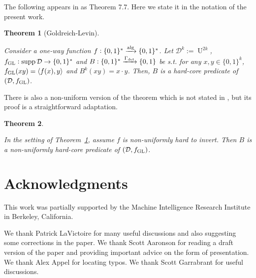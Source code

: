 \documentclass{article}
\numberwithin{equation}{section}
\theoremstyle{definition}
\theoremstyle{plain}
\newtheorem{theorem}{Theorem}[section]
\newcommand{\Bool}{\{0,1\}}
\newcommand{\Words}{{\Bool^*}}
\newcommand{\WordsLen}[1]{{\Bool^{#1}}}
\DeclareMathOperator{\Supp}{supp}
\DeclareMathOperator{\Un}{U}
\newcommand{\Chev}[1]{\langle #1 \rangle}
\newcommand{\Dist}{\mathcal{D}}
\newcommand{\Alg}{\xrightarrow{\textnormal{alg}}}
\begin{document}
The following appears in \cite{Goldreich_2008} as Theorem 7.7. Here we state it in the notation of the present work.

\begin{theorem}[Goldreich-Levin]
\label{thm:goldreich_levin}

Consider a one-way function ${f: \Words \Alg \Words}$. Let $\Dist^k:=\Un^{2k}$, $f_{\textnormal{GL}}: \Supp \Dist \rightarrow \Words$ and ${B: \Words \xrightarrow{\Gamma_{\textnormal{det}}} \Bool}$ be s.t. for any $x,y \in \WordsLen{k}$, $f_{\textnormal{GL}}(xy)=\Chev{f(x),y}$ and ${B^k(xy)=x \cdot y}$. Then, $B$ is a hard-core predicate of $(\Dist, f_{\textnormal{GL}})$.

\end{theorem}

There is also a non-uniform version of the theorem which is not stated in \cite{Goldreich_2008}, but its proof is a straightforward adaptation.

\begin{theorem}
\label{thm:goldreich_levin_circ}

In the setting of Theorem~\ref{thm:goldreich_levin}, assume $f$ is non-uniformly hard to invert. Then $B$ is a non-uniformly hard-core predicate of $(\Dist, f_{\textnormal{GL}})$.
\end{theorem}

\section*{Acknowledgments}

This work was partially supported by the Machine Intelligence Research Institute in Berkeley, California.

We thank Patrick LaVictoire for many useful discussions and also suggesting some corrections in the paper. We thank Scott Aaronson for reading a draft version of the paper and providing important advice on the form of presentation. We thank Alex Appel for locating typos. We thank Scott Garrabrant for useful discussions.



\end{document}
